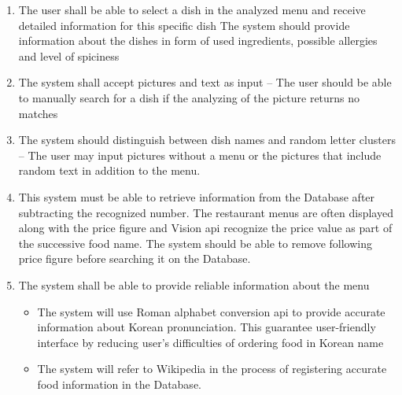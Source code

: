 \begin{enumerate}[label=A.\arabic*]
\item The user shall be able to select a dish in the analyzed menu and receive detailed information for this specific dish
The system should provide information about the dishes in form of used ingredients, possible allergies and level of spiciness
\item The system shall accept pictures and text as input – The user should be able to manually search for a dish if the analyzing of the picture returns no matches
\item The system should distinguish between dish names and random letter clusters – The user may input pictures without a menu or the pictures that include random text in addition to the menu.
\item This system must be able to retrieve information from the Database after subtracting the recognized number. The restaurant menus are often displayed along with the price figure and Vision api recognize the price value as part of the successive food name. The system should be able to remove following price figure before searching it on the Database.
\item The system shall be able to provide reliable information about the menu 
    \begin{itemize}
    \item The system will use Roman alphabet conversion api to provide accurate information about Korean pronunciation. This guarantee user-friendly interface by reducing user’s difficulties of ordering food in Korean name
    \item The system will refer to Wikipedia in the process of registering accurate food information in the Database. 
    \end{itemize}
\end{enumerate}

